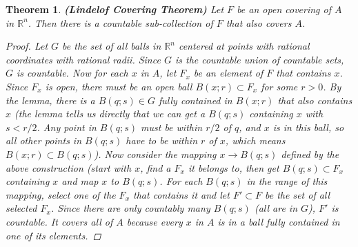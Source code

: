 \documentclass[11pt,a4paper]{report}
\theoremstyle{plain}
\newtheorem{thm}{Theorem}[section]
\theoremstyle{definition}
\theoremstyle{remark}
\begin{document}
\begin{thm}
\textbf{(Lindelof Covering Theorem)} Let $F$ be an open covering of $A$ in $\mathbb{R}^n$. Then there is a countable sub-collection of $F$ that also covers $A$. 
\begin{proof}
Let $G$ be the set of all balls in $\mathbb{R}^n$  centered at points with rational coordinates with rational radii.  Since $G$ is the countable union of countable sets, $G$ is countable.  Now for each $x$ in $A$, let $F_x$ be an element of $F$ that contains $x$.  Since $F_x$ is open, there must be an open ball $B(x;r) \subset F_x$ for some $r>0$. By the lemma, there is a $B(q;s) \in G$ fully contained in $B(x;r)$ that also contains $x$ (the lemma tells us directly that we can get a $B(q;s)$ containing $x$ with $s < r / 2$. Any point in $B(q;s)$ must be within $r/2$ of $q$, and $x$ is in this ball, so all other points in $B(q;s)$ have to be within $r$ of $x$, which means $B(x;r) \subset B(q;s)$).  Now consider the mapping $x \rightarrow B(q;s)$ defined by the above construction (start with $x$, find a $F_x$ it belongs to, then get $B(q;s) \subset F_x$ containing $x$ and map $x$ to $B(q;s)$.  For each $B(q;s)$ in the range of this mapping, select one of the $F_x$ that contains it and let $F' \subset F$ be the set of all selected $F_x$. Since there are only countably many $B(q;s)$ (all are in $G$), $F'$ is countable.  It covers all of $A$ because every $x$ in $A$ is in a ball fully contained in one of its elements.  

\end{proof}
\end{thm}
\end{document}
